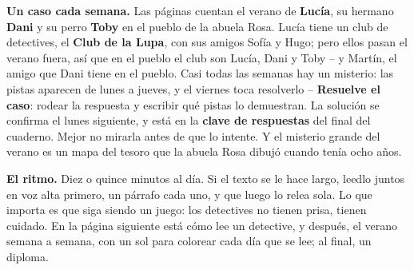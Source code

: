\textbf{Un caso cada semana.} Las páginas cuentan el verano de
\textbf{Lucía}, su hermano \textbf{Dani} y su perro \textbf{Toby} en el
pueblo de la abuela Rosa. Lucía tiene un club de detectives, el
\textbf{Club de la Lupa}, con sus amigos Sofía y Hugo; pero ellos pasan
el verano fuera, así que en el pueblo el club son Lucía, Dani y Toby
-- y Martín, el amigo que Dani tiene en el pueblo. Casi todas las
semanas hay un misterio: las pistas aparecen de lunes a jueves, y el
viernes toca resolverlo --
\textbf{Resuelve el caso}: rodear la respuesta y escribir qué pistas lo
demuestran. La solución se confirma el lunes siguiente, y está en la
\textbf{clave de respuestas} del final del cuaderno. Mejor no mirarla
antes de que lo intente. Y el misterio grande del verano es un mapa del
tesoro que la abuela Rosa dibujó cuando tenía ocho años.

\textbf{El ritmo.} Diez o quince minutos al día. Si el texto se le hace
largo, leedlo juntos en voz alta primero, un párrafo cada uno, y que
luego lo relea sola. Lo que importa es que siga siendo un juego: los
detectives no tienen prisa, tienen cuidado. En la página siguiente está
cómo lee un detective, y después, el verano semana a semana, con un sol
para colorear cada día que se lee; al final, un diploma.
\newpage
